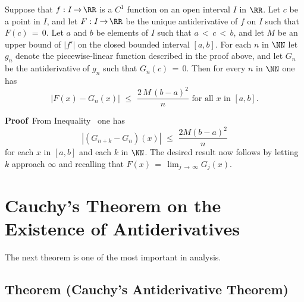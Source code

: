 {\V

        Suppose that $f:I \,{\rightarrow}\, {\RR}$ is a $C^{1}$ function on an open interval $I$ in ${\RR}$.
    Let $c$ be a point in $I$, and let $F:I \,{\rightarrow}\, {\RR}$ be the unique antiderivative of $f$ on $I$ such that $F(c) \,=\, 0$.
    Let $a$ and $b$ be elements of $I$ such that $a\,<\,c\,<\,b$, and let $M$ be an upper bound of $|f'|$ on the closed bounded interval $[a,b]$.
    For each $n$ in ${\NN}$ let $g_{n}$ denote the piecewise-linear function described in the proof above,
    and let $G_{n}$ be the antiderivative of $g_{n}$ such that $G_{n}(c) \,=\, 0$. Then for every $n$ in ${\NN}$ one has
        \begin{displaymath}
        |F(x)-G_{n}(x)|\,\,{\leq}\,\,\frac{2\,M\,(b-a)^{2}}{n} \mbox{ for all $x$ in $[a,b]$}.
        \end{displaymath}

\V

        {\bf Proof}\, From Inequality~ one has
        \begin{displaymath}
        \left|\left(G_{n+k}-G_{n}\right)(x)\right|\,\,{\leq}\,\,\frac{2M(b-a)^{2}}{n}
        \end{displaymath}
    for each $x$ in $[a,b]$ and each $k$ in ${\NN}$.
    The desired result now follows by letting $k$ approach ${\infty}$ and recalling that $F(x) \,=\, \lim_{j \,{\rightarrow}\, {\infty}} G_{j}(x)$.

\VV
}%

\VV

                \section{{\bf Cauchy's Theorem on the Existence of Antiderivatives}} 
                \label{SectE45D} %


\VV


        The next theorem is one of the most important in analysis.

\VV

             \subsection{\small{\bf Theorem} (Cauchy's Antiderivative Theorem)}
                         \label{ThmE45.125B}

